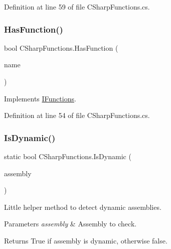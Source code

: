 Definition at line 59 of file C\+Sharp\+Functions.\+cs.

\mbox{\label{class_c_sharp_functions_ac272ce8ef722b90c5c9c95c93527f85a}} 
\subsubsection{\texorpdfstring{Has\+Function()}{HasFunction()}}
{\footnotesize\ttfamily bool C\+Sharp\+Functions.\+Has\+Function (\begin{DoxyParamCaption}\item[{string}]{name }\end{DoxyParamCaption})}



Implements \hyperlink{interface_i_functions_a55a472175a59db8ec3b00c5dad20cf20}{I\+Functions}.



Definition at line 54 of file C\+Sharp\+Functions.\+cs.

\mbox{\label{class_c_sharp_functions_a440e1fe10d78acf073131c5bd955ff53}} 
\subsubsection{\texorpdfstring{Is\+Dynamic()}{IsDynamic()}}
{\footnotesize\ttfamily static bool C\+Sharp\+Functions.\+Is\+Dynamic (\begin{DoxyParamCaption}\item[{Assembly}]{assembly }\end{DoxyParamCaption})\hspace{0.3cm}{\ttfamily [static]}}



Little helper method to detect dynamic assemblies. 


\begin{DoxyParams}{Parameters}
{\em assembly} & Assembly to check.\\
\hline
\end{DoxyParams}
\begin{DoxyReturn}{Returns}
True if assembly is dynamic, otherwise false.
\end{DoxyReturn}



